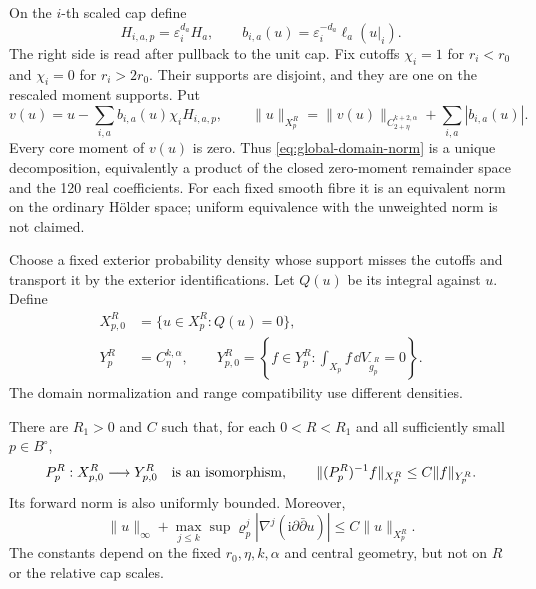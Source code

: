 On the $i$-th scaled cap define
\begin{equation}\label{eq:physical-cap-moments}
 H_{i,a,p}=\varepsilon_i^{d_a}H_a,\qquad
 b_{i,a}(u)=\varepsilon_i^{-d_a}\ell_a(u|_i).
\end{equation}
The right side is read after pullback to the unit cap.
Fix cutoffs $\chi_i=1$ for $r_i<r_0$ and $\chi_i=0$
for $r_i>2r_0$. Their supports are disjoint, and they
are one on the rescaled moment supports. Put
\begin{equation}\label{eq:global-domain-norm}
 v(u)=u-\sum_{i,a}b_{i,a}(u)\chi_iH_{i,a,p},
 \qquad
 \|u\|_{X_p^R}
   =\|v(u)\|_{C^{k+2,\alpha}_{2+\eta}}
                        +\sum_{i,a}|b_{i,a}(u)|.
\end{equation}
Every core moment of $v(u)$ is zero. Thus
\eqref{eq:global-domain-norm} is a unique decomposition,
equivalently a product of the closed zero-moment
remainder space and the 120 real coefficients.
For each fixed smooth fibre it is an equivalent
norm on the ordinary Hölder space; uniform
equivalence with the unweighted norm is not claimed.

Choose a fixed exterior probability density whose
support misses the cutoffs and transport it by the
exterior identifications. Let $Q(u)$ be its integral
against $u$. Define
\[
 \begin{split}
 X_{p,0}^R&=\{u\in X_p^R:Q(u)=0\},\\
 Y_p^R&=C^{k,\alpha}_\eta,\qquad
 Y_{p,0}^R=\left\{f\in Y_p^R:
                \int_{X_p}f\,\dd V_{\widetilde g_p^R}=0\right\}.
 \end{split}
\]
The domain normalization and range compatibility
use different densities.

\begin{theorem}\label{thm:global-scalar-inverse}
There are $R_1>0$ and $C$ such that, for each
$0<R<R_1$ and all sufficiently small $p\in B^\circ$,
\begin{equation}\label{eq:global-scalar-inverse}
 P_p^R:X_{p,0}^R\longrightarrow Y_{p,0}^R
 \quad\hbox{is an isomorphism},\qquad
 \|(P_p^R)^{-1}f\|_{X_p^R}\le C\|f\|_{Y_p^R}.
\end{equation}
Its forward norm is also uniformly bounded. Moreover,
\begin{equation}\label{eq:domain-hessian-control}
 \|u\|_\infty+
 \max_{j\le k}\sup\varrho_p^j
   |\nabla^j(\mathrm i\partial\bar\partial u)|
       \le C\|u\|_{X_p^R}.
\end{equation}
The constants depend on the fixed $r_0,\eta,k,\alpha$
and central geometry, but not on $R$ or the relative
cap scales.
\end{theorem}

